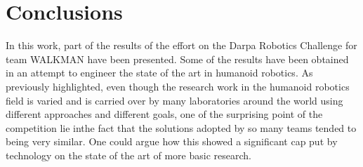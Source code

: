 \documentclass[%
	paper=A4,					%
	twoside=true,				%
	openright,			.
	parskip=full,				%
	chapterprefix=true,			%
	11pt,						%
	headings=normal,			%
	bibliography=totoc,			%
	listof=totoc,				%
	titlepage=on,				%
	captions=tableabove,		%
	draft=true,				%
]{scrreprt}%
\begin{document}
\chapter{Conclusions}

In this work, part of the results of the effort on the Darpa Robotics Challenge for team WALKMAN have been presented.
Some of the results have been obtained in an attempt to engineer the state of the art in humanoid robotics.
As previously highlighted, even though the research work in the humanoid robotics field is varied and is carried over by many laboratories around the world using different approaches and different goals, one of the surprising point of the competition lie inthe fact that the solutions adopted by so many teams tended to being very similar. One could argue how this showed a significant cap put by technology on the state of the art of more basic research.
\end{document}
